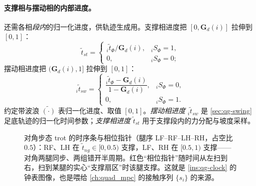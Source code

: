 \paragraph{支撑相与摆动相的内部进度。}
还需各相\emph{段内}的归一化进度，供轨迹生成用。支撑相进度把 $[0,\mathbf{G}_d(i)]$ 拉伸到 $[0,1]$\cite{yu2021quadruped}：
\begin{equation}
  \tilde t_{st}=
  \begin{cases}
  {}_i\tilde t_\Phi/\mathbf{G}_d(i), & {}_iS_\Phi=1,\\
  0, & {}_iS_\Phi=0;
  \end{cases}
  \label{eq:qg-stance-prog}
\end{equation}
摆动相进度把 $(\mathbf{G}_d(i),1]$ 拉伸到 $[0,1]$\cite{yu2021quadruped}：
\begin{equation}
  {}_i\tilde t_{sw}=
  \begin{cases}
  \dfrac{{}_i\tilde t_\Phi-\mathbf{G}_d(i)}{1-\mathbf{G}_d(i)}, & {}_iS_\Phi=0,\\[8pt]
  0, & {}_iS_\Phi=1.
  \end{cases}
  \label{eq:qg-swing-prog}
\end{equation}
约定带波浪 $\tilde{(\cdot)}$ 表归一化进度、取值 $[0,1]$。\emph{摆动相进度} ${}_i\tilde t_{sw}$ 是 \cref{sec:qg-swing} 足底轨迹的归一化时间参数；\emph{支撑相进度} $\tilde t_{st}$ 用于支撑段内的力分配与坡度采样。

\begin{figure}[ht]
\centering
{}
\caption{对角步态 trot 的时序条与相位指针（腿序 LF–RF–LH–RH，占空比 $0.5$）：RF、LH 在 $\tilde t_{ng}\in[0,0.5)$ 支撑，LF、RH 在 $[0.5,1)$ 支撑——对角两腿同步、两组错开半周期。红色“相位指针”随时间从左扫到右，扫到某腿的实心“支撑扇区”时该腿支撑。这就是 \cref{ins:qg-clock} 的钟表图像，也是喂给 \cref{ch:quad_mpc} 的接触序列 $\{s_i\}$ 的来源。}
\label{fig:qg-gait-timing}
\end{figure}

